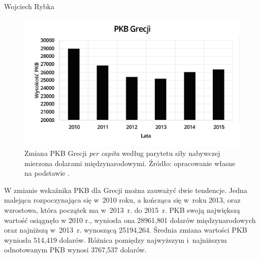 \begin{artplenv}{Wojciech Rybka}
\begin{figure}[H]
	\centering
	\includegraphics[width=1\textwidth]{ART_Rybka/pkb_grecji.png} 
	\caption{Zmiana PKB Grecji \textit{per capita} według parytetu siły nabywczej mierzona dolarami międzynarodowymi.
		Źródło: opracowanie własne na podstawie
		\parencite{international_monetary_fund_world_2019a}.
	}
	\label{fig4:ryb}
\end{figure}

%
%

W zmianie wskaźnika PKB dla Grecji można zauważyć dwie tendencje. Jedna malejąca rozpoczynająca się w~2010 roku,
a kończąca się w~roku 2013, oraz wzrostowa, która początek ma w~2013~r. do 2015~r. PKB swoją największą wartość osiągnęło
w 2010 r., wyniosła ona 28961,801 dolarów międzynarodowych oraz najniższą w~2013~r. wynoszącą 25194,264. Średnia zmiana
wartości PKB wyniosła 514,419 dolarów. Różnica pomiędzy najwyższym i~najniższym odnotowanym PKB wynosi 3767,537 dolarów.



\end{artplenv}
